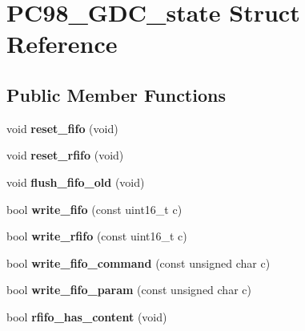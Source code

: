 \hypertarget{structPC98__GDC__state}{\section{P\-C98\-\_\-\-G\-D\-C\-\_\-state Struct Reference}
\label{structPC98__GDC__state}
}
\subsection*{Public Member Functions}
\begin{DoxyCompactItemize}
\item 
\hypertarget{structPC98__GDC__state_a7973469db8c58471cd105cc5f2513bb1}{void {\bfseries reset\-\_\-fifo} (void)}\label{structPC98__GDC__state_a7973469db8c58471cd105cc5f2513bb1}

\item 
\hypertarget{structPC98__GDC__state_a4836b9d30ad97c0d491c628c493a31a3}{void {\bfseries reset\-\_\-rfifo} (void)}\label{structPC98__GDC__state_a4836b9d30ad97c0d491c628c493a31a3}

\item 
\hypertarget{structPC98__GDC__state_a0eab727dd82dfad6c340daaa337f442d}{void {\bfseries flush\-\_\-fifo\-\_\-old} (void)}\label{structPC98__GDC__state_a0eab727dd82dfad6c340daaa337f442d}

\item 
\hypertarget{structPC98__GDC__state_af404e360236ebfe30003bd00761e7eb1}{bool {\bfseries write\-\_\-fifo} (const uint16\-\_\-t c)}\label{structPC98__GDC__state_af404e360236ebfe30003bd00761e7eb1}

\item 
\hypertarget{structPC98__GDC__state_acf3c8fd9e5eab6ff8e7a69cacf5c7189}{bool {\bfseries write\-\_\-rfifo} (const uint16\-\_\-t c)}\label{structPC98__GDC__state_acf3c8fd9e5eab6ff8e7a69cacf5c7189}

\item 
\hypertarget{structPC98__GDC__state_a19867db16d1d33edb3cec74c9c8596cd}{bool {\bfseries write\-\_\-fifo\-\_\-command} (const unsigned char c)}\label{structPC98__GDC__state_a19867db16d1d33edb3cec74c9c8596cd}

\item 
\hypertarget{structPC98__GDC__state_aedfc62f64c943388975adedbc30458bf}{bool {\bfseries write\-\_\-fifo\-\_\-param} (const unsigned char c)}\label{structPC98__GDC__state_aedfc62f64c943388975adedbc30458bf}

\item 
\hypertarget{structPC98__GDC__state_ad34b46692e4fe7b2bc059509a5b465af}{bool {\bfseries rfifo\-\_\-has\-\_\-content} (void)}\label{structPC98__GDC__state_ad34b46692e4fe7b2bc059509a5b465af}


\end{DoxyCompactItemize}
